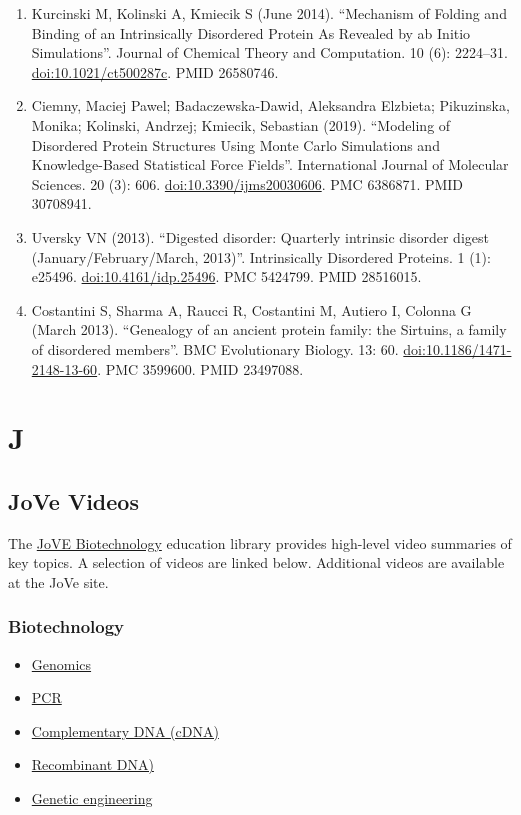 \documentclass[
]{book}
\providecommand{\tightlist}{%
  \setlength{\itemsep}{0pt}\setlength{\parskip}{0pt}}
\begin{document}
\begin{enumerate}
\item
  Kurcinski M, Kolinski A, Kmiecik S (June 2014). ``Mechanism of Folding and Binding of an Intrinsically Disordered Protein As Revealed by ab Initio Simulations''. Journal of Chemical Theory and Computation. 10 (6): 2224--31. \url{doi:10.1021/ct500287c}. PMID 26580746.
\item
  Ciemny, Maciej Pawel; Badaczewska-Dawid, Aleksandra Elzbieta; Pikuzinska, Monika; Kolinski, Andrzej; Kmiecik, Sebastian (2019). ``Modeling of Disordered Protein Structures Using Monte Carlo Simulations and Knowledge-Based Statistical Force Fields''. International Journal of Molecular Sciences. 20 (3): 606. \url{doi:10.3390/ijms20030606}. PMC 6386871. PMID 30708941.
\item
  Uversky VN (2013). ``Digested disorder: Quarterly intrinsic disorder digest (January/February/March, 2013)''. Intrinsically Disordered Proteins. 1 (1): e25496. \url{doi:10.4161/idp.25496}. PMC 5424799. PMID 28516015.
\item
  Costantini S, Sharma A, Raucci R, Costantini M, Autiero I, Colonna G (March 2013). ``Genealogy of an ancient protein family: the Sirtuins, a family of disordered members''. BMC Evolutionary Biology. 13: 60. \url{doi:10.1186/1471-2148-13-60}. PMC 3599600. PMID 23497088.
\end{enumerate}

\hypertarget{j}{%
\chapter{J}\label{j}}

\hypertarget{jove-videos}{%
\section{JoVe Videos}\label{jove-videos}}

The \href{https://www.jove.com/science-education-library/59/biotechnology}{JoVE Biotechnology} education library provides high-level video summaries of key topics. A selection of videos are linked below. Additional videos are available at the JoVe site.

\hypertarget{biotechnology}{%
\subsection{Biotechnology}\label{biotechnology}}

\begin{itemize}
\tightlist
\item
  \href{https://www.jove.com/science-education/11122/genomics}{Genomics}
\item
  \href{https://www.jove.com/science-education/10819/pcr}{PCR}
\item
  \href{https://www.jove.com/science-education/10818/complementary-dna}{Complementary DNA (cDNA)}
\item
  \href{https://www.jove.com/science-education/10808/recombinant-dna}{Recombinant DNA)}
\item
  \href{https://www.jove.com/science-education/10806/what-is-genetic-engineering}{Genetic engineering}
\end{itemize}
\end{document}
